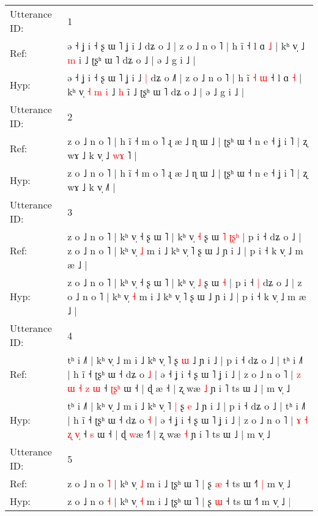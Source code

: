 \documentclass[10pt]{article}
\DeclareRobustCommand{\hl}[1]{{\textcolor{red}{#1}}}
\begin{document}
\begin{longtable}{ll}
\toprule
Utterance ID: & 1 \\
Ref: & ə ˧ ʝ i ˧ ʂ ɯ ˥ ʝ i ˩\hl{}\hl{} dʑ o ˩\hl{} | z o ˩ n o ˥ | h ĩ\hl{}\hl{}\hl{}\hl{} ˧ l ɑ \hl{˩} | kʰ v̩\hl{}\hl{}\hl{}\hl{}\hl{}\hl{} ˩ \hl{m} i\hl{} ˩ ʈʂʰ ɯ ˥ dʑ o ˩ | ə ˩ g i ˩ |
 \\
Hyp: & ə ˧ ʝ i ˧ ʂ ɯ ˥ ʝ i ˩\hl{ }\hl{|} dʑ o ˩\hl{˥} | z o ˩ n o ˥ | h ĩ\hl{ }\hl{˧}\hl{ }\hl{ɯ} ˧ l ɑ \hl{˧} | kʰ v̩\hl{ }\hl{˧}\hl{ }\hl{m}\hl{ }\hl{i} ˩ \hl{h} i\hl{̃} ˩ ʈʂʰ ɯ ˥ dʑ o ˩ | ə ˩ g i ˩ |
 \\
\midrule
Utterance ID: & 2 \\
Ref: & z o ˩ n o ˥ | h ĩ ˧ m o ˥ ɻ æ ˩ ɳ ɯ ˩ | ʈʂʰ ɯ ˧ n e ˧ ʝ i ˥ | ʐ wɤ ˩ k v̩ ˩\hl{ }\hl{w}\hl{ɤ}\hl{ }˥ |
 \\
Hyp: & z o ˩ n o ˥ | h ĩ ˧ m o ˥ ɻ æ ˩ ɳ ɯ ˩ | ʈʂʰ ɯ ˧ n e ˧ ʝ i ˥ | ʐ wɤ ˩ k v̩ ˩\hl{}\hl{}\hl{}\hl{}˥ |
 \\
\midrule
Utterance ID: & 3 \\
Ref: & z o ˩ n o ˥ | kʰ v̩ ˧ ʂ ɯ ˥ | kʰ v̩ \hl{˧} ʂ ɯ\hl{ }\hl{˥} \hl{ʈ}\hl{ʂ}\hl{ʰ} | p i ˧\hl{}\hl{} dʑ o ˩ | z o ˩ n o ˥ | kʰ v̩ \hl{˩} m i ˩ kʰ v̩ ˥ ʂ ɯ ˩ ɲ i ˩ | p i ˧ k v̩ ˩ m æ ˩ |
 \\
Hyp: & z o ˩ n o ˥ | kʰ v̩ ˧ ʂ ɯ ˥ | kʰ v̩ \hl{˩} ʂ ɯ\hl{}\hl{} \hl{}\hl{}\hl{˧} | p i ˧\hl{ }\hl{|} dʑ o ˩ | z o ˩ n o ˥ | kʰ v̩ \hl{˧} m i ˩ kʰ v̩ ˥ ʂ ɯ ˩ ɲ i ˩ | p i ˧ k v̩ ˩ m æ ˩ |
 \\
\midrule
Utterance ID: & 4 \\
Ref: & tʰ i ˩˥ | kʰ v̩ ˩ m i ˩ kʰ v̩ ˥\hl{}\hl{} ʂ \hl{ɯ} ˩ ɲ i ˩ | p i ˧ dʑ o ˩ | tʰ i ˩˥ | h ĩ ˧ ʈʂʰ ɯ ˧ dʑ o \hl{˩} | ə ˧ ʝ i ˧ ʂ ɯ ˥ ʝ i ˩ | z o ˩ n o ˥ | \hl{z} \hl{ɯ} \hl{˧} \hl{z}\hl{ }\hl{ɯ} ˧ \hl{ʈ}\hl{ʂ}\hl{ʰ} ɯ ˧ | ɖ \hl{}æ ˧\hl{} | ʐ wæ \hl{˩} ɲ i ˥ ts ɯ ˩ | m v̩ ˩
 \\
Hyp: & tʰ i ˩˥ | kʰ v̩ ˩ m i ˩ kʰ v̩ ˥\hl{ }\hl{|} ʂ \hl{e} ˩ ɲ i ˩ | p i ˧ dʑ o ˩ | tʰ i ˩˥ | h ĩ ˧ ʈʂʰ ɯ ˧ dʑ o \hl{˧} | ə ˧ ʝ i ˧ ʂ ɯ ˥ ʝ i ˩ | z o ˩ n o ˥ | \hl{ɤ} \hl{˧} \hl{ʐ} \hl{}\hl{v}\hl{̩} ˧ \hl{}\hl{}\hl{s} ɯ ˧ | ɖ \hl{w}æ ˧\hl{˥} | ʐ wæ \hl{˧} ɲ i ˥ ts ɯ ˩ | m v̩ ˩
 \\
\midrule
Utterance ID: & 5 \\
Ref: & z o ˩ n o \hl{˥} | kʰ v̩ \hl{˩} m i ˩ ʈʂʰ ɯ ˥ | ʂ \hl{æ} ˧ ts ɯ ˧˥\hl{ }\hl{|} m v̩ ˩\hl{}\hl{}
 \\
Hyp: & z o ˩ n o \hl{˧} | kʰ v̩ \hl{˧} m i ˩ ʈʂʰ ɯ ˥ | ʂ \hl{ɯ} ˧ ts ɯ ˧˥\hl{}\hl{} m v̩ ˩\hl{ }\hl{|}
 \\

\end{longtable}
\end{document}

